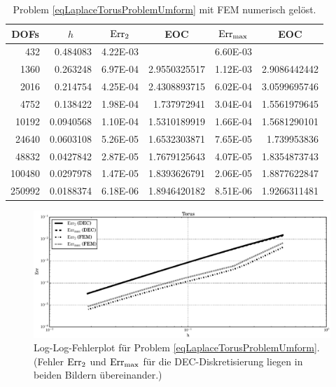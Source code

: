 \begin{beispiel}[Torus]
       \begin{table}[htbp]
       \centering
       \begin{tabular}{|r|r|r|r|r|r|}
       \hline
       \multicolumn{1}{|c|}{DOFs} & \multicolumn{1}{c|}{\( h \)} & \multicolumn{1}{c|}{\( \text{Err}_{2} \)} & \multicolumn{1}{c|}{EOC} &
       \multicolumn{1}{c|}{ \( \text{Err}_{\max} \)} & \multicolumn{1}{c|}{EOC} \\ \hline
        432 & 0.484083 & 4.22E-03 & \multicolumn{1}{l|}{} & 6.60E-03 & \multicolumn{1}{l|}{} \\ \hline
        1360 & 0.263248 & 6.97E-04 & 2.9550325517 & 1.12E-03 & 2.9086442442 \\ \hline
        2016 & 0.214754 & 4.25E-04 & 2.4308893715 & 6.02E-04 & 3.0599695746 \\ \hline
        4752 & 0.138422 & 1.98E-04 & 1.737972941 & 3.04E-04 & 1.5561979645 \\ \hline
        10192 & 0.0940568 & 1.10E-04 & 1.5310189919 & 1.66E-04 & 1.5681290101 \\ \hline
        24640 & 0.0603108 & 5.26E-05 & 1.6532303871 & 7.65E-05 & 1.739953836 \\ \hline
        48832 & 0.0427842 & 2.87E-05 & 1.7679125643 & 4.07E-05 & 1.8354873743 \\ \hline
        100480 & 0.0297978 & 1.47E-05 & 1.8393626791 & 2.06E-05 & 1.8877622847 \\ \hline
        250992 & 0.0188374 & 6.18E-06 & 1.8946420182 & 8.51E-06 & 1.9266311481 \\ \hline
       \end{tabular}
       \caption[Laplace auf Torus (FEM)]{Problem \eqref{eqLaplaceTorusProblemUmform} mit FEM numerisch gelöst.}
       \label{tabLaplaceTorusFEM}
       \end{table}
      \begin{figure}
        \centering\includegraphics[width=\textwidth]{bilder/laplaceTorus/errplot.eps}
        \caption[Fehlerplot (Laplace auf Torus)]
                {Log-Log-Fehlerplot für Problem \eqref{eqLaplaceTorusProblemUmform}.
                 (Fehler \( \text{Err}_{2} \) und \( \text{Err}_{\max} \) für die DEC-Diskretisierung liegen 
                  in beiden Bildern übereinander.)}
        \label{figFehlerPlotLaplaceTorus}
      \end{figure}
    \end{beispiel}



